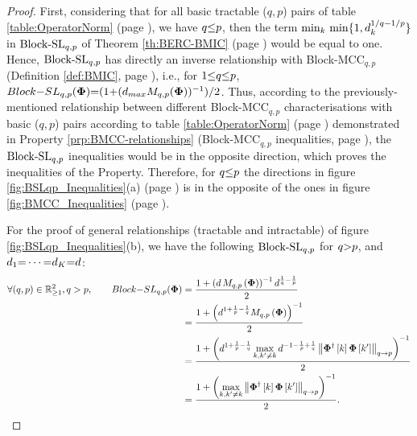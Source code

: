 \begin{proof}
First, considering that for all basic tractable ($q,p$) pairs of table \ref{table:OperatorNorm} (page \pageref{table:OperatorNorm}), we have $q {\leq} p$, then the term $\min_{k} \, \min \{1 , d_k^{1/q {-} 1/p} \}$ in $\mathrm{Block\text{{-}}SL}_{q,p}$ of Theorem \ref{th:BERC-BMIC} (page \pageref{th:BERC-BMIC}) would be equal to one.
Hence, $\mathrm{Block\text{{-}}SL}_{q,p}$ has directly an inverse relationship with Block-MCC$_{q,p}$ (Definition \ref{def:BMIC}, page \pageref{def:BMIC}), i.e., for $1 {\leq} q {\leq} p$, $Block{-}SL_{q,p}(\boldsymbol{\Phi}) {=} (1 {+} (d_{max} M_{q,p}(\boldsymbol{\Phi}))^{-1}) {/} 2$.
Thus, according to the previously-mentioned relationship between different Block-MCC$_{q,p}$ characterisations with basic ($q,p$) pairs according to table \ref{table:OperatorNorm} (page \pageref{table:OperatorNorm}) demonstrated in Property \ref{prp:BMCC-relationships} (Block-MCC$_{q,p}$ inequalities, page \pageref{prp:BMCC-relationships}), the $\mathrm{Block\text{{-}}SL}_{q,p}$ inequalities would be in the opposite direction, which proves the inequalities of the Property.
Therefore, for $q {\leq} p$ the directions in figure \ref{fig:BSLqp_Inequalities}(a) (page \pageref{fig:BSLqp_Inequalities}) is in the opposite of the ones in figure \ref{fig:BMCC_Inequalities} (page \pageref{fig:BMCC_Inequalities}).

For the proof of general relationships (tractable and intractable) of figure \ref{fig:BSLqp_Inequalities}(b), we have the following $\mathrm{Block\text{{-}}SL}_{q,p}$ for $q {>} p$, and $d_1 {=} \cdots {=} d_K {=} d$:
\begin{gather}
\label{eq:BSLq>p} 
\begin{aligned}
\forall (q , p) \in \mathbb{R}^2_{\geq 1}, q > p, \qquad
Block{-}SL_{q,p}(\boldsymbol{\Phi}) &= \frac{1 + \left( d \, M_{q,p}\left( \boldsymbol{\Phi} \right)  \right)^{-1} d^{\frac1q - \frac1p}}{2} \\
&= \frac{1 + \left( d^{1 + \frac1p - \frac1q}  M_{q,p}\left( \boldsymbol{\Phi} \right) \right)^{-1} }{2} \\
&= \frac{1 + \left( d^{1 + \frac1p - \frac1q}  \displaystyle\max_{k,k' \neq k} d^{-1 - \frac1p + \frac1q} \left\lVert\boldsymbol{\Phi}^\dagger\left[ k \right] \boldsymbol{\Phi} \left[ k' \right]\right\rVert_{q \to p} \right)^{-1} }{2} \\
&= \frac{1 + \left( \displaystyle\max_{k,k' \neq k} \left\lVert\boldsymbol{\Phi}^\dagger\left[ k \right] \boldsymbol{\Phi} \left[ k' \right]\right\rVert_{q \to p} \right)^{-1} }{2}.
\end{aligned}
\end{gather}


\end{proof}
